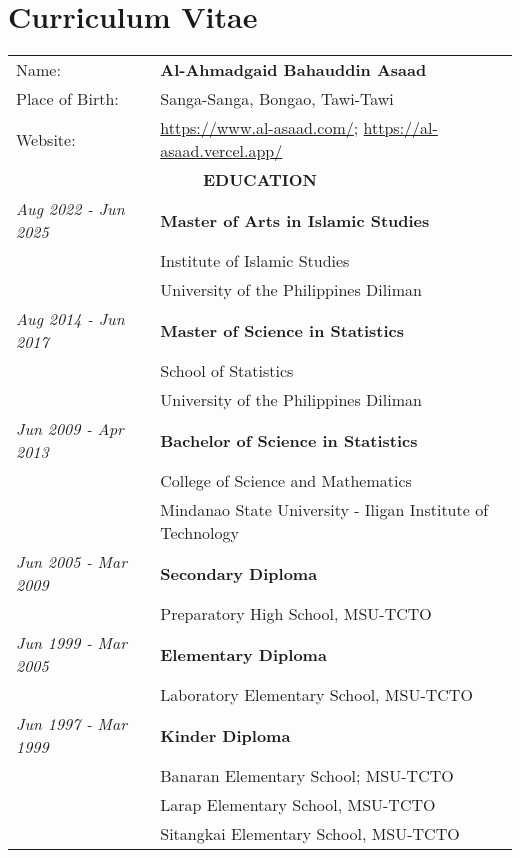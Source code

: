 \chapter*{Curriculum Vitae}
\label{ch:cv}
\begin{tabularx}{\textwidth}[!t]{ll}
Name:& \textbf{Al-Ahmadgaid Bahauddin Asaad}\\
Place of Birth:& Sanga-Sanga, Bongao, Tawi-Tawi\\
Website: & \url{https://www.al-asaad.com/}; \url{https://al-asaad.vercel.app/}\\[0.7cm]
\multicolumn{2}{c}{\bf EDUCATION}\\[0.3cm]
\textit{Aug 2022 - Jun 2025}& \textbf{Master of Arts in Islamic Studies}\\
& Institute of Islamic Studies\\
& University of the Philippines Diliman\\[0.5cm]

\textit{Aug 2014 - Jun 2017}& \textbf{Master of Science in Statistics}\\
& School of Statistics\\
& University of the Philippines Diliman\\[0.5cm]

\textit{Jun 2009 - Apr 2013}& \textbf{Bachelor of Science in Statistics}\\
& College of Science and Mathematics\\
& Mindanao State University - Iligan Institute of Technology\\[0.5cm]

\textit{Jun 2005 - Mar 2009}& \textbf{Secondary Diploma}\\
& Preparatory High School, MSU-TCTO\\[0.5cm]

\textit{Jun 1999 - Mar 2005}& \textbf{Elementary Diploma}\\
& Laboratory Elementary School, MSU-TCTO\\[0.5cm]

\textit{Jun 1997 - Mar 1999}& \textbf{Kinder Diploma}\\
& Banaran Elementary School; MSU-TCTO\\
& Larap Elementary School, MSU-TCTO\\
& Sitangkai Elementary School, MSU-TCTO\\[0.7cm]
\end{tabularx}

